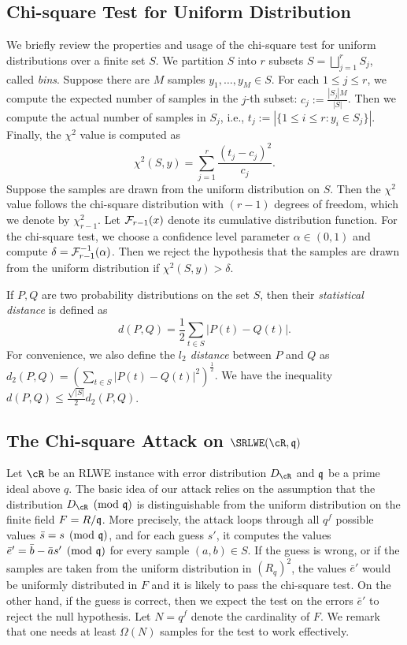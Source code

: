 \documentclass[envcountsame]{llncs}
\begin{document}
\subsection{Chi-square Test for Uniform Distribution}
We briefly review the properties and usage of the chi-square test for uniform distributions over a finite set $S$. We partition $S$ into $r$ subsets $S = \bigsqcup_{j=1}^r S_j$, called \emph{bins}.
Suppose there are $M$ samples $y_1, \ldots, y_M \in S$.
For each $1 \leq j \leq r$, we compute the expected number of samples in the $j$-th subset: $c_j := \frac{|S_j|M}{|S|}$. Then we compute the actual number of samples in $S_j$, i.e., $t_j := |\{1 \leq i \leq r: y_i \in S_j\}|$. Finally, the $\chi^2$ value is computed as
\[
    \chi^2(S,y) = \sum_{j = 1}^r \frac{(t_j -c_j)^2}{c_j}.
\]
Suppose the samples are drawn from the uniform distribution on $S$. Then the $\chi^2$ value follows the chi-square distribution with $(r-1)$ degrees of freedom, which we denote by $\chi_{r-1}^2$. Let $\mathcal{F}_{r-1}(x)$ denote its cumulative distribution function. For the chi-square test, we choose a confidence level parameter $\alpha \in (0,1)$ and compute $\delta = \mathcal{F}_{r-1}^{-1}(\alpha)$. Then we reject the hypothesis that the samples are drawn from the uniform distribution if $\chi^2(S,y)  > \delta$.

If $P,Q$ are two probability distributions on the set $S$, then their {\it statistical distance} is defined as
\[
    d(P,Q) = \frac{1}{2} \sum_{t \in S} |P(t) - Q(t)|.
\]
For convenience, we also define the {\it $l_2$ distance} between $P$ and $Q$ as $d_2(P,Q) = (\sum_{t \in S} |P(t) - Q(t)|^2)^{\frac{1}{2}}$. We have the inequality $d(P,Q) \leq \frac{\sqrt{|S|}}{2}d_2(P,Q)$.


\subsection{The Chi-square Attack on $\SRLWE(\cR,\fq)$}

Let $\cR$ be an RLWE instance with error distribution $D_{\cR}$ and $\mathfrak{q}$ be a prime ideal above $q$.  The basic idea of our attack relies on the assumption that the distribution $D_\cR \pmod {\fq}$ is distinguishable from the uniform distribution on the finite field $F = R/\mathfrak{q}$. More precisely, the attack loops through all $q^f$ possible values $\bar{s} = s \pmod{\mathfrak{q}}$, and for each guess $s'$, it computes the values $\bar{e}' = \bar{b} - \bar{a} s' \pmod {\mathfrak{q}}$ for every sample $(a,b) \in S$. If the guess is wrong, or if the samples are taken from the uniform distribution in $(R_q)^2$, the values $\bar{e}'$ would be uniformly distributed in $F$ and it is likely to pass the chi-square test. On the other hand, if the guess is correct, then we expect the test on the errors $\bar{e}'$ to reject the null hypothesis. Let $N = q^f$ denote the cardinality of $F$. We remark that one needs at least $\Omega(N)$ samples for the test to work effectively.
\end{document}
